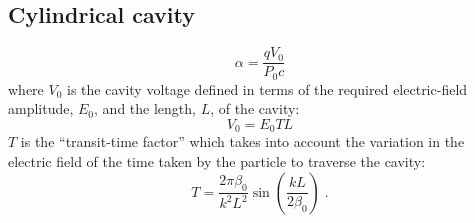 \subsection{Cylindrical cavity}

\begin{equation}
  \alpha = \frac{q V_0}{P_0 c}
\end{equation}
where $V_0$ is the cavity voltage defined in terms of the required
electric-field amplitude, $E_0$, and the length, $L$, of the cavity:
\begin{equation}
  V_0 = E_0 TL 
\end{equation}
$T$ is the ``transit-time factor'' which takes into account the
variation in the electric field of the time taken by the particle to
traverse the cavity:
\begin{equation}
  T = \frac{2\pi\beta_0}{k^2L^2} \sin\left( \frac{k L}{2\beta_0} \right) \; .
\end{equation}

